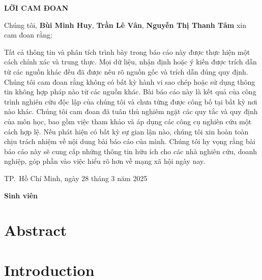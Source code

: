 \documentclass[
]{article}
\author{}
\date{\vspace{-2.5em}}
\begin{document}


\newpage
\thispagestyle{empty}

\begin{center}
    \LARGE \textbf{LỜI CAM ĐOAN}
\end{center}
\vspace{1.5em}

Chúng tôi, \textbf{Bùi Minh Huy}, \textbf{Trần Lê Vân}, \textbf{Nguyễn
Thị Thanh Tâm} xin cam đoan rằng:

Tất cả thông tin và phân tích trình bày trong báo cáo này được thực hiện
một cách chính xác và trung thực. Mọi dữ liệu, nhận định hoặc ý kiến
được trích dẫn từ các nguồn khác đều đã được nêu rõ nguồn gốc và trích
dẫn đúng quy định. Chúng tôi cam đoan rằng không có bất kỳ hành vi sao
chép hoặc sử dụng thông tin không hợp pháp nào từ các nguồn khác. Bài
báo cáo này là kết quả của công trình nghiên cứu độc lập của chúng tôi
và chưa từng được công bố tại bất kỳ nơi nào khác. Chúng tôi cam đoan đã
tuân thủ nghiêm ngặt các quy tắc và quy định của môn học, bao gồm việc
tham khảo và áp dụng các công cụ nghiên cứu một cách hợp lệ. Nếu phát
hiện có bất kỳ sự gian lận nào, chúng tôi xin hoàn toàn chịu trách nhiệm
về nội dung bài báo cáo của mình. Chúng tôi hy vọng rằng bài báo cáo này
sẽ cung cấp những thông tin hữu ích cho các nhà nghiên cứu, doanh
nghiệp, góp phần vào việc hiểu rõ hơn về mạng xã hội ngày nay.

\vspace{3em}

\begin{flushright}
\begin{minipage}{0.5\textwidth}
\raggedleft
TP.\ Hồ Chí Minh, ngày 28 tháng 3 năm 2025

\vspace{1em}

\centering
\textbf{\LARGE Sinh viên}
\end{minipage}
\end{flushright}

\newpage
\thispagestyle{empty}
\tableofcontents
\newpage
{}
\setcounter{page}{1}

\section{Abstract}\label{abstract}

\section{Introduction}\label{introduction}
\end{document}
